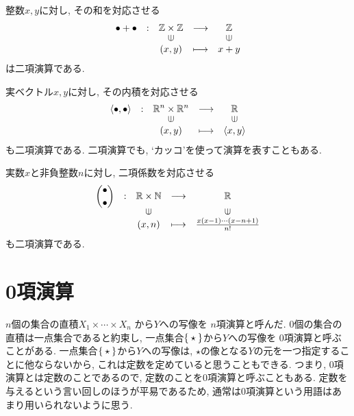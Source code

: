 \begin{example}
  整数$x,y$に対し, その和を対応させる
  \begin{align*}
    \shazo{\bullet+\bullet}
          {\ZZ\times \ZZ}{\ZZ}
          {(x,y)}{x+y}
  \end{align*}
  は二項演算である.
\end{example}
\begin{example}
  実ベクトル$x,y$に対し, その内積を対応させる
  \begin{align*}
    \shazo{\Braket{\bullet,\bullet}}
          {\RR^n\times \RR^n}{\RR}
          {(x,y)}{\Braket{x,y}}
  \end{align*}
  も二項演算である.
  二項演算でも, `カッコ'を使って演算を表すこともある.
\end{example}

\begin{example}
  実数$x$と非負整数$n$に対し,
  二項係数を対応させる
  \begin{align*}
    \shazo{\binom{\bullet}{\bullet}}
          {\RR\times \NN}{\RR}
          {(x,n)}{\frac{x(x-1)\cdots(x-n+1)}{n!}}
  \end{align*}
  も二項演算である.
\end{example}


\section{0項演算}
$n$個の集合の直積$X_1\times \cdots \times X_n$
から$Y$への写像を
$n$項演算と呼んだ.
$0$個の集合の直積は一点集合であると約束し,
一点集合$\Set{\star}$から$Y$への写像を
$0$項演算と呼ぶことがある.
一点集合$\Set{\star}$から$Y$への写像は,
$\star$の像となる$Y$の元を一つ指定することに他ならないから,
これは定数を定めていると思うこともできる.
つまり, $0$項演算とは定数のことであるので,
定数のことを$0$項演算と呼ぶこともある.
定数を与えるという言い回しのほうが平易であるため,
通常は$0$項演算という用語はあまり用いられないように思う.

